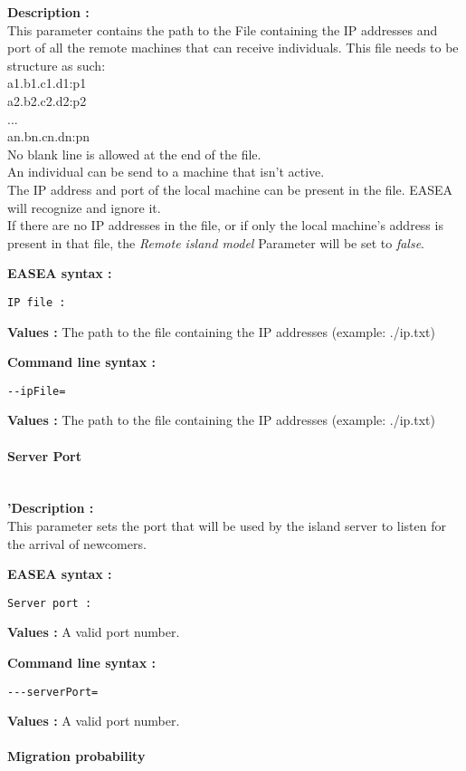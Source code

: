 \documentclass{book}
\begin{document}
\textbf{Description :}\\This parameter contains the path to the File
containing the IP addresses and port of all the remote machines that can
receive individuals. This file needs to be structure as
such:\\a1.b1.c1.d1:p1\\a2.b2.c2.d2:p2\\...\\an.bn.cn.dn:pn\\No blank
line is allowed at the end of the file.\\An individual can be send to a
machine that isn't active.\\The IP address and port of the local machine
can be present in the file. EASEA will recognize and ignore it.\\If
there are no IP addresses in the file, or if only the local machine's
address is present in that file, the \emph{Remote island model}
Parameter will be set to \emph{false}.

\textbf{EASEA syntax :}

\texttt{IP~file~:}

\textbf{Values :} The path to the file containing the IP addresses
(example: ./ip.txt)

\textbf{Command line syntax :}

\texttt{-{}-ipFile=}

\textbf{Values :} The path to the file containing the IP addresses
(example: ./ip.txt)

\paragraph{Server Port}\label{server-port}
~\\

\textbf{'Description :}\\This parameter sets the port that will be used
by the island server to listen for the arrival of newcomers.

\textbf{EASEA syntax :}

\texttt{Server~port~:}

\textbf{Values :} A valid port number.

\textbf{Command line syntax :}

\texttt{-{}-{}-serverPort=}

\textbf{Values :} A valid port number.

\paragraph{Migration probability}\label{migration-probability}
~\\
\end{document}
